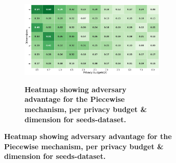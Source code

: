 \begin{figure}[H]
\begin{subfigure}[b]{0.85\textwidth}
        \begin{subfigure}[c]{1\textwidth}
            \caption{\textbf{Heatmap showing adversary advantage for the Piecewise mechanism, per privacy budget \& dimension for seeds-dataset.}}
            \includegraphics[width=1\textwidth]{Results/kd-laplace/piecewise/seeds-dataset/shokri_mi_adv.png}
            \label{fig:privacy_seeds-dataset_adversial_advantage_piecewise}
        \end{subfigure}
    \end{subfigure}
    \hfill %
    \begin{subfigure}[b]{0.075\textwidth}

\end{subfigure}
\end{figure}
